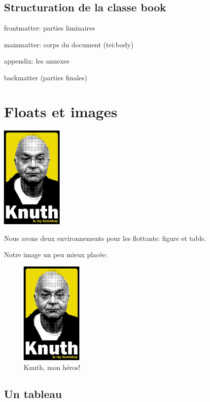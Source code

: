 \documentclass[12pt,a4paper]{book} %
\begin{document}
\subsection{Structuration de la classe book}

frontmatter: parties liminaires

mainmatter: corps du document (tei:body)

appendix: les annexes

backmatter (parties finales)


\section{Floats et images}


\includegraphics[width=3cm]{knuth.jpg}

Nous avons deux environnements pour les flottants: figure et table.

Notre image un peu mieux placée:
\begin{figure}[!b]
\begin{center}
\includegraphics[width=3cm]{knuth.jpg}
\end{center}
\caption{Knuth, mon héros!}
\end{figure}

\subsection{Un tableau}
\end{document}
